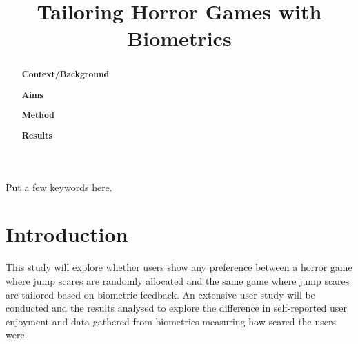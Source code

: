 \documentclass[12pt,a4paper]{article}\usepackage[]{graphicx}\usepackage[]{color}
\title{Tailoring Horror Games with Biometrics}
\author{} %
\date{}
\begin{document}
\maketitle

\begin{abstract}


\textbf{Context/Background}

\textbf{Aims}

\textbf{Method}

\textbf{Results}


\end{abstract}

\begin{keywords}
Put a few keywords here.
\end{keywords}

\section{Introduction}


This study will explore whether users show any preference between a horror game where jump scares are randomly allocated and the same game where jump scares are tailored based on biometric feedback. An extensive user study will be conducted and the results analysed to explore the difference in self-reported user enjoyment and data gathered from biometrics measuring how scared the users were.
\end{document}
